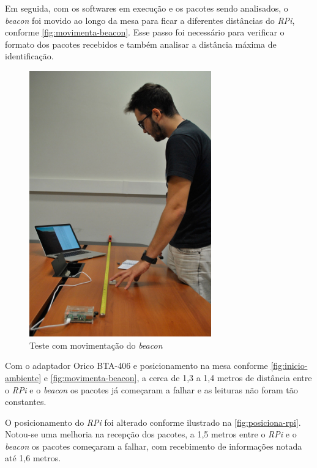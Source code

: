 Em seguida, com os softwares em execução e os pacotes sendo analisados, o \textit{beacon} foi movido ao longo da mesa para ficar a diferentes distâncias do \textit{RPi}, conforme \autoref{fig:movimenta-beacon}. Esse passo foi necessário para verificar o formato dos pacotes recebidos e também analisar a distância máxima de identificação.

\begin{figure}[htb]
	\caption{\label{fig:movimenta-beacon}Teste com movimentação do \textit{beacon}}
	\begin{center}
		\includegraphics[width=0.7\textwidth]{img/ambiente4.jpg}
	\end{center}
\end{figure}

Com o adaptador Orico BTA-406 e posicionamento na mesa conforme \autoref{fig:inicio-ambiente} e \autoref{fig:movimenta-beacon}, a cerca de 1,3 a 1,4 metros de distância entre o \textit{RPi} e o \textit{beacon} os pacotes já começaram a falhar e as leituras não foram tão constantes.

O posicionamento do \textit{RPi} foi alterado conforme ilustrado na \autoref{fig:posiciona-rpi}. Notou-se uma melhoria na recepção dos pacotes, a 1,5 metros entre o \textit{RPi} e o \textit{beacon} os pacotes começaram a falhar, com recebimento de informações notada até 1,6 metros.

